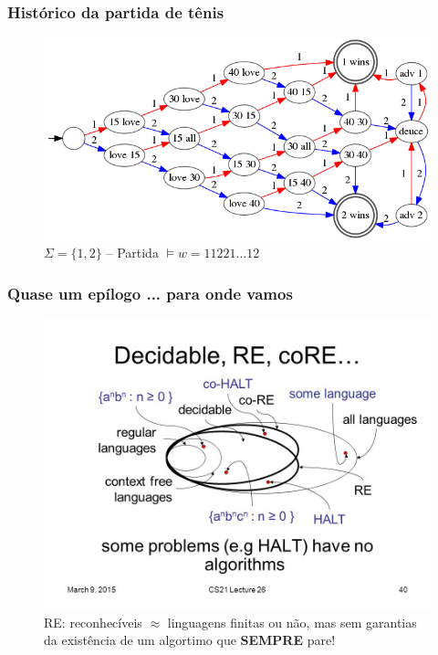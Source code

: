 \documentclass[10pt]{beamer}
\begin{document}
\begin{frame}[fragile]

\frametitle{Histórico da partida de tênis}
\begin{figure}[!ht]
\centering
\includegraphics[height =.65\textheight,width=.8\textwidth]
{figuras/01_jogo_tenis_MEF.png}
\caption{$\Sigma = \{1,2\}$ -- Partida $\models w = 11221 ... 12 $}
\end{figure}

\end{frame}





\begin{frame}[fragile]

\frametitle{Quase um epílogo ... para onde vamos}

\begin{figure}[!ht]
\centering
\includegraphics[height =.65\textheight,width=.8\textwidth]
{figuras/some+problems+have+no+algorithms_HALT.jpg}
\caption{RE: reconhecíveis $\approx $ linguagens finitas ou não, mas sem garantias
da existência de um algortimo que \textbf{SEMPRE} pare!}
\end{figure}

\end{frame}
\end{document}

